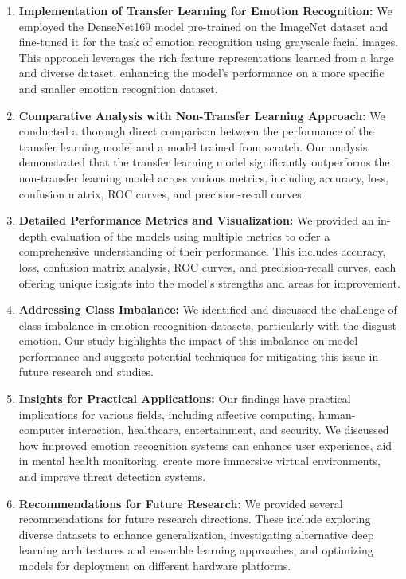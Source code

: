 \documentclass[conference]{IEEEtran}
\begin{document}
\begin{enumerate}
    \item \textbf{Implementation of Transfer Learning for Emotion Recognition:} We employed the DenseNet169 model pre-trained on the ImageNet dataset and fine-tuned it for the task of emotion recognition using grayscale facial images. This approach leverages the rich feature representations learned from a large and diverse dataset, enhancing the model's performance on a more specific and smaller emotion recognition dataset.

    \item \textbf{Comparative Analysis with Non-Transfer Learning Approach:} We conducted a thorough direct comparison between the performance of the transfer learning model and a model trained from scratch. Our analysis demonstrated that the transfer learning model significantly outperforms the non-transfer learning model across various metrics, including accuracy, loss, confusion matrix, ROC curves, and precision-recall curves.

    \item \textbf{Detailed Performance Metrics and Visualization:} We provided an in-depth evaluation of the models using multiple metrics to offer a comprehensive understanding of their performance. This includes accuracy, loss, confusion matrix analysis, ROC curves, and precision-recall curves, each offering unique insights into the model's strengths and areas for improvement.

    \item \textbf{Addressing Class Imbalance:} We identified and discussed the challenge of class imbalance in emotion recognition datasets, particularly with the disgust emotion. Our study highlights the impact of this imbalance on model performance and suggests potential techniques for mitigating this issue in future research and studies.

    \item \textbf{Insights for Practical Applications:} Our findings have practical implications for various fields, including affective computing, human-computer interaction, healthcare, entertainment, and security. We discussed how improved emotion recognition systems can enhance user experience, aid in mental health monitoring, create more immersive virtual environments, and improve threat detection systems.

    \item \textbf{Recommendations for Future Research:} We provided several recommendations for future research directions. These include exploring diverse datasets to enhance generalization, investigating alternative deep learning architectures and ensemble learning approaches, and optimizing models for deployment on different hardware platforms.

\end{enumerate}
\end{document}
